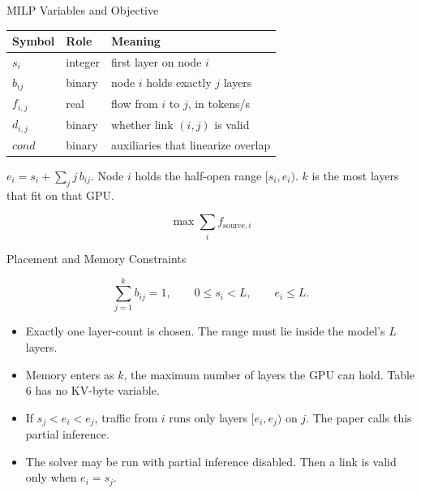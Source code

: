 \begin{frame}[t,label=mm_hx_milp_01]{MILP Variables and Objective}

  \par
  \vspace{.06cm}
  {\centering\footnotesize
  \begin{tabular}{lll}\toprule
    Symbol & Role & Meaning\\\midrule
    \(s_i\) & integer & first layer on node \(i\)\\
    \(b_{ij}\) & binary & node \(i\) holds exactly \(j\) layers\\
    \(f_{i,j}\) & real & flow from \(i\) to \(j\), in tokens/s\\
    \(d_{i,j}\) & binary & whether link \((i,j)\) is valid\\
    \(\mathit{cond}\) & binary & auxiliaries that linearize overlap\\\bottomrule
  \end{tabular}\par}
  \vspace{.08cm}
  {\footnotesize \(e_i=s_i+\sum_j j\,b_{ij}\). Node \(i\) holds the half-open range \([s_i,e_i)\). \(k\) is the most layers that fit on that GPU.}\par
  \vspace{.06cm}
  \[
    \max \sum_i f_{\mathrm{source},i}
  \]
  \vspace{.08cm}
\end{frame}

\begin{frame}[t,label=mm_hx_milp_02]{Placement and Memory Constraints}

  \par
  \vspace{.10cm}
  \[
    \sum_{j=1}^{k} b_{ij}=1,
    \qquad 0\le s_i<L,
    \qquad e_i\le L.
  \]
  \begin{itemize}\footnotesize
    \setlength{\itemsep}{.07cm}
    \item Exactly one layer-count is chosen. The range must lie inside the model's \(L\) layers.
    \item Memory enters as \(k\), the maximum number of layers the GPU can hold. Table 6 has no KV-byte variable.
    \item If \(s_j<e_i<e_j\), traffic from \(i\) runs only layers \([e_i,e_j)\) on \(j\). The paper calls this partial inference.
    \item The solver may be run with partial inference disabled. Then a link is valid only when \(e_i=s_j\).
  \end{itemize}
  \vspace{.12cm}
\end{frame}

